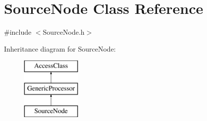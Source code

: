 \hypertarget{classSourceNode}{\section{Source\-Node Class Reference}
\label{classSourceNode}
}


{\ttfamily \#include $<$Source\-Node.\-h$>$}

Inheritance diagram for Source\-Node\-:\begin{figure}[H]
\begin{center}
\leavevmode
\includegraphics[height=3.000000cm]{classSourceNode}
\end{center}
\end{figure}
